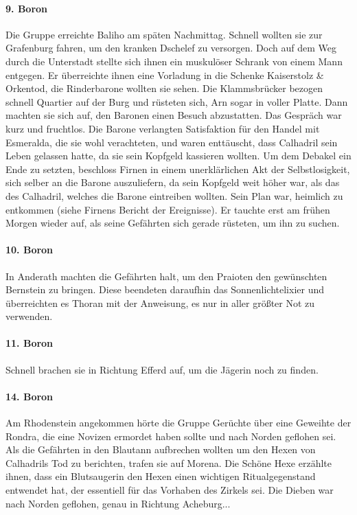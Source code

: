 \documentclass[11pt]{scrreprt}
\begin{document}
\paragraph{9. Boron}
Die Gruppe erreichte Baliho am späten Nachmittag. Schnell wollten sie zur Grafenburg fahren, um den kranken Dschelef zu versorgen. Doch auf dem Weg durch die Unterstadt stellte sich ihnen ein muskulöser Schrank von einem Mann entgegen. Er überreichte ihnen eine Vorladung in die Schenke Kaiserstolz \& Orkentod, die Rinderbarone wollten sie sehen. Die Klammsbrücker bezogen schnell Quartier auf der Burg und rüsteten sich, Arn sogar in voller Platte. Dann machten sie sich auf, den Baronen einen Besuch abzustatten.
Das Gespräch war kurz und fruchtlos. Die Barone verlangten Satisfaktion für den Handel mit Esmeralda, die sie wohl verachteten, und waren enttäuscht, dass Calhadril sein Leben gelassen hatte, da sie sein Kopfgeld kassieren wollten. Um dem Debakel ein Ende zu setzten, beschloss Firnen in einem unerklärlichen Akt der Selbstlosigkeit, sich selber an die Barone auszuliefern, da sein Kopfgeld weit höher war, als das des Calhadril, welches die Barone eintreiben wollten. Sein Plan war, heimlich zu entkommen (siehe Firnens Bericht der Ereignisse).
Er tauchte erst am frühen Morgen wieder auf, als seine Gefährten sich gerade rüsteten, um ihn zu suchen.

\paragraph{10. Boron}
In Anderath machten die Gefährten halt, um den Praioten den gewünschten Bernstein zu bringen. Diese beendeten daraufhin das Sonnenlichtelixier und überreichten es Thoran mit der Anweisung, es nur in aller größter Not zu verwenden.

\paragraph{11. Boron}
Schnell brachen sie in Richtung Efferd auf, um die Jägerin noch zu finden.

\paragraph{14. Boron}
Am Rhodenstein angekommen hörte die Gruppe Gerüchte über eine Geweihte der Rondra, die eine Novizen ermordet haben sollte und nach Norden geflohen sei. Als die Gefährten in den Blautann aufbrechen wollten um den Hexen von Calhadrils Tod zu berichten, trafen sie auf Morena. Die Schöne Hexe erzählte ihnen, dass ein Blutsaugerin den Hexen einen wichtigen Ritualgegenstand entwendet hat, der essentiell für das Vorhaben des Zirkels sei. Die Dieben war nach Norden geflohen, genau in Richtung Acheburg... \par
\end{document}
